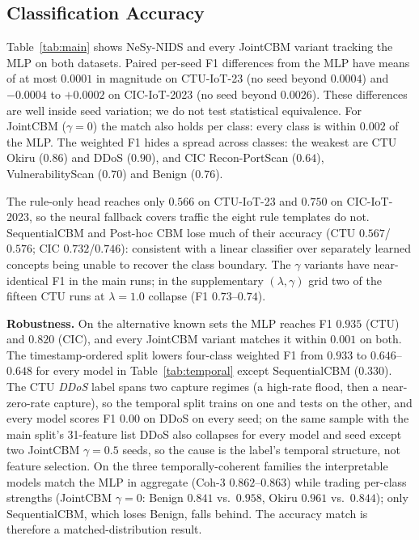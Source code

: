 \documentclass[journal]{IEEEtran}
\begin{document}
\subsection{Classification Accuracy}
\label{sec:acc}

\begin{sloppypar}
Table~\ref{tab:main} shows NeSy-NIDS and every JointCBM variant tracking the MLP on both datasets. Paired per-seed F1 differences from the MLP have means of at most $0.0001$ in magnitude on CTU-IoT-23 (no seed beyond $0.0004$) and $-0.0004$ to $+0.0002$ on CIC-IoT-2023 (no seed beyond $0.0026$). These differences are well inside seed variation; we do not test statistical equivalence. For JointCBM ($\gamma{=}0$) the match also holds per class: every class is within $0.002$ of the MLP. The weighted F1 hides a spread across classes: the weakest are CTU Okiru ($0.86$) and DDoS ($0.90$), and CIC Recon-PortScan ($0.64$), VulnerabilityScan ($0.70$) and Benign ($0.76$).
\end{sloppypar}

The rule-only head reaches only $0.566$ on CTU-IoT-23 and $0.750$ on CIC-IoT-2023, so the neural fallback covers traffic the eight rule templates do not. SequentialCBM and Post-hoc CBM lose much of their accuracy (CTU $0.567$/$0.576$; CIC $0.732$/$0.746$): consistent with a linear classifier over separately learned concepts being unable to recover the class boundary. The $\gamma$ variants have near-identical F1 in the main runs; in the supplementary $(\lambda,\gamma)$ grid two of the fifteen CTU runs at $\lambda{=}1.0$ collapse (F1 $0.73$--$0.74$).

\textbf{Robustness.} On the alternative known sets the MLP reaches F1 $0.935$ (CTU) and $0.820$ (CIC), and every JointCBM variant matches it within $0.001$ on both. The timestamp-ordered split lowers four-class weighted F1 from $0.933$ to $0.646$--$0.648$ for every model in Table~\ref{tab:temporal} except SequentialCBM ($0.330$). The CTU \emph{DDoS} label spans two capture regimes (a high-rate flood, then a near-zero-rate capture), so the temporal split trains on one and tests on the other, and every model scores F1 $0.00$ on DDoS on every seed; on the same sample with the main split's 31-feature list DDoS also collapses for every model and seed except two JointCBM $\gamma{=}0.5$ seeds, so the cause is the label's temporal structure, not feature selection. On the three temporally-coherent families the interpretable models match the MLP in aggregate (Coh-3 $0.862$--$0.863$) while trading per-class strengths (JointCBM $\gamma{=}0$: Benign $0.841$ vs.\ $0.958$, Okiru $0.961$ vs.\ $0.844$); only SequentialCBM, which loses Benign, falls behind. The accuracy match is therefore a matched-distribution result.
\end{document}
